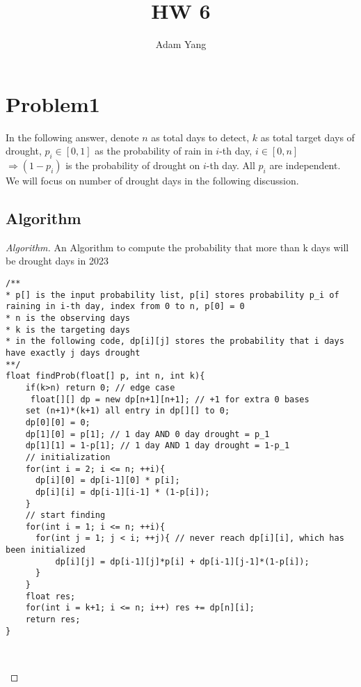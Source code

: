 \documentclass[openany]{article}
\begin{document}
\title{HW 6}
\author{Adam Yang}
\maketitle




\section*{Problem1}

In the following answer, denote $n$ as total days to detect, $k$ as total target days of drought, $p_i\in [0,1]$ as the probability of rain in $i$-th day, $i\in [0,n]$ $\Rightarrow (1-p_i)$ is the probability of drought on $i$-th day. All $p_i$ are independent. We will focus on number of drought days in the following discussion.

\subsection*{Algorithm}
\begin{proof}[Algorithm]{}
		\renewcommand{\qedsymbol}{}
		An Algorithm to compute the probability that more than k days will be drought days in 2023
		\begin{lstlisting}[basicstyle=\fontsize{8}{9}\selectfont\ttfamily]
/**
* p[] is the input probability list, p[i] stores probability p_i of raining in i-th day, index from 0 to n, p[0] = 0
* n is the observing days
* k is the targeting days
* in the following code, dp[i][j] stores the probability that i days have exactly j days drought
**/
float findProb(float[] p, int n, int k){
    if(k>n) return 0; // edge case
	 float[][] dp = new dp[n+1][n+1]; // +1 for extra 0 bases
    set (n+1)*(k+1) all entry in dp[][] to 0;
    dp[0][0] = 0;
    dp[1][0] = p[1]; // 1 day AND 0 day drought = p_1
    dp[1][1] = 1-p[1]; // 1 day AND 1 day drought = 1-p_1
    // initialization
    for(int i = 2; i <= n; ++i){
      dp[i][0] = dp[i-1][0] * p[i];
      dp[i][i] = dp[i-1][i-1] * (1-p[i]);
    }
    // start finding
    for(int i = 1; i <= n; ++i){
      for(int j = 1; j < i; ++j){ // never reach dp[i][i], which has been initialized
          dp[i][j] = dp[i-1][j]*p[i] + dp[i-1][j-1]*(1-p[i]);
      }
    }
    float res;
    for(int i = k+1; i <= n; i++) res += dp[n][i];
    return res;
}

        
		\end{lstlisting} 
\end{proof}
\end{document}
